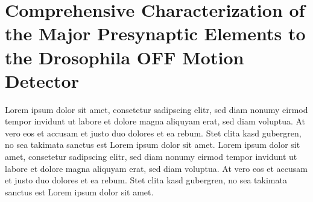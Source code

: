 \section{Comprehensive Characterization of the Major Presynaptic Elements to the Drosophila OFF Motion Detector}
\label{sct:manuscript_serbe}

Lorem ipsum dolor sit amet, consetetur sadipscing elitr, sed diam nonumy eirmod tempor invidunt ut labore et dolore magna aliquyam erat, sed diam voluptua. At vero eos et accusam et justo duo dolores et ea rebum. Stet clita kasd gubergren, no sea takimata sanctus est Lorem ipsum dolor sit amet. Lorem ipsum dolor sit amet, consetetur sadipscing elitr, sed diam nonumy eirmod tempor invidunt ut labore et dolore magna aliquyam erat, sed diam voluptua. At vero eos et accusam et justo duo dolores et ea rebum. Stet clita kasd gubergren, no sea takimata sanctus est Lorem ipsum dolor sit amet.

\newpage
